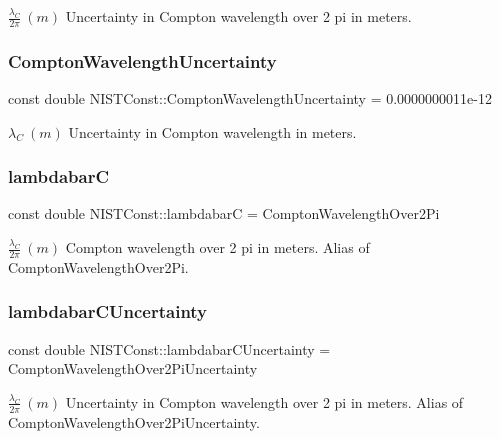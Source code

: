 $\frac{\lambda_C}{2\pi} \ (m)$ Uncertainty in Compton wavelength over 2 pi in meters. \mbox{\label{group___n_i_s_t_const-_compton_wavelength_ga4845f956ea0bf6f4eaf7396173b09430}} 
\subsubsection{\texorpdfstring{Compton\+Wavelength\+Uncertainty}{ComptonWavelengthUncertainty}}
{\footnotesize\ttfamily const double N\+I\+S\+T\+Const\+::\+Compton\+Wavelength\+Uncertainty = 0.\+0000000011e-\/12}

$\lambda_C \ (m)$ Uncertainty in Compton wavelength in meters. \mbox{\label{group___n_i_s_t_const-_compton_wavelength_gaeed48ca7330a4ba9227043237fed90f9}} 
\subsubsection{\texorpdfstring{lambdabarC}{lambdabarC}}
{\footnotesize\ttfamily const double N\+I\+S\+T\+Const\+::lambdabarC = Compton\+Wavelength\+Over2\+Pi}

$\frac{\lambda_C}{2\pi} \ (m)$ Compton wavelength over 2 pi in meters. Alias of Compton\+Wavelength\+Over2\+Pi. \mbox{\label{group___n_i_s_t_const-_compton_wavelength_ga56b8e49aa3ccbfb73a500f63c9fd3b05}} 
\subsubsection{\texorpdfstring{lambdabar\+C\+Uncertainty}{lambdabarCUncertainty}}
{\footnotesize\ttfamily const double N\+I\+S\+T\+Const\+::lambdabar\+C\+Uncertainty = Compton\+Wavelength\+Over2\+Pi\+Uncertainty}

$\frac{\lambda_C}{2\pi} \ (m)$ Uncertainty in Compton wavelength over 2 pi in meters. Alias of Compton\+Wavelength\+Over2\+Pi\+Uncertainty. \mbox{\label{group___n_i_s_t_const-_compton_wavelength_gae311e27b1f359b90efb6895ddf388a80}} 
